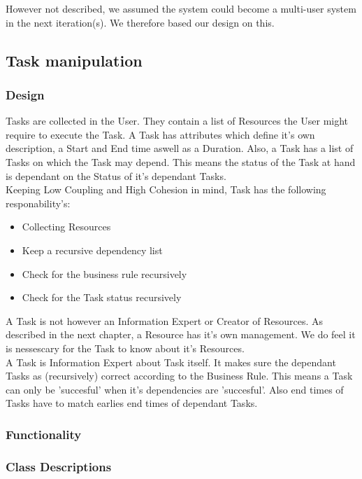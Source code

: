 \documentclass[a4paper,11pt]{article}
\begin{document}
		However not described, we assumed the system could become a multi-user system in the next iteration(s). We therefore based our design on this.
		\subsection{Task manipulation}
			\subsubsection{Design}
			Tasks are collected in the User. They contain a list of Resources the User might require to execute the Task.
			A Task has attributes which define it's own description, a Start and End time aswell as a Duration.
			Also, a Task has a list of Tasks on which the Task may depend. This means the status of the Task at hand is dependant on the Status of it's dependant Tasks.\\
			Keeping Low Coupling and High Cohesion in mind, Task has the following responability's:
			\begin{itemize}
				\item{Collecting Resources}
				\item{Keep a recursive dependency list}
				\item{Check for the business rule recursively}
				\item{Check for the Task status recursively}
			\end{itemize}
			A Task is not however an Information Expert or Creator of Resources. As described in the next chapter, a Resource has it's own management.
			We do feel it is nessescary for the Task to know about it's Resources.\\
			A Task is Information Expert about Task itself. It makes sure the dependant Tasks as (recursively) correct according to the Business Rule. This means a Task can only be 'succesful' when it's dependencies are 'succesful'. Also end times of Tasks have to match earlies end times of dependant Tasks.			
			\subsubsection{Functionality}
			
			\subsubsection{Class Descriptions}
			
\end{document}
